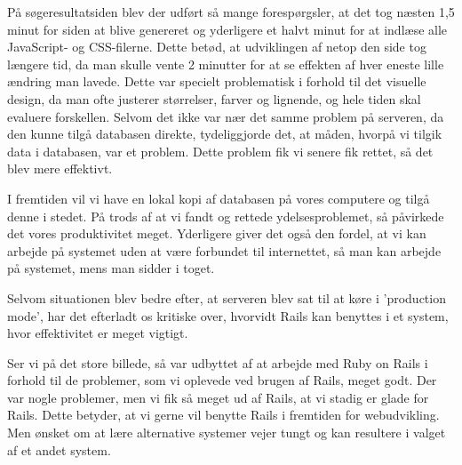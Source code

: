 På søgeresultatsiden blev der udført så mange forespørgsler, at det tog næsten 1,5 minut for siden at blive genereret og yderligere et halvt minut for at indlæse alle JavaScript- og CSS-filerne. Dette betød, at udviklingen af netop den side tog længere tid, da man skulle vente 2 minutter for at se effekten af hver eneste lille ændring man lavede. Dette var specielt problematisk i forhold til det visuelle design, da man ofte justerer størrelser, farver og lignende, og hele tiden skal evaluere forskellen. Selvom det ikke var nær det samme problem på serveren, da den kunne tilgå databasen direkte, tydeliggjorde det, at måden, hvorpå vi tilgik data i databasen, var et problem. Dette problem fik vi senere fik rettet, så det blev mere effektivt.

I fremtiden vil vi have en lokal kopi af databasen på vores computere og tilgå denne i stedet. På trods af at vi fandt og rettede ydelsesproblemet, så påvirkede det vores produktivitet meget. Yderligere giver det også den fordel, at vi kan arbejde på systemet uden at være forbundet til internettet, så man \fx kan arbejde på systemet, mens man sidder i toget.

Selvom situationen blev bedre efter, at serveren blev sat til at køre i 'production mode', har det efterladt os kritiske over, hvorvidt Rails kan benyttes i et system, hvor effektivitet er meget vigtigt.

Ser vi på det store billede, så var udbyttet af at arbejde med Ruby on Rails i forhold til de problemer, som vi oplevede ved brugen af Rails, meget godt. Der var nogle problemer, men vi fik så meget ud af Rails, at vi stadig er glade for Rails. Dette betyder, at vi gerne vil benytte Rails i fremtiden for webudvikling. Men ønsket om at lære alternative systemer vejer tungt og kan resultere i valget af et andet system.
